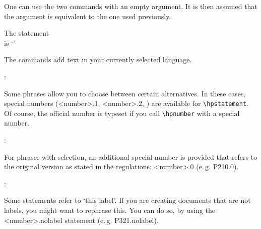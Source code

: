 \documentclass[a4paper,notitlepage,parskip=half]{scrreprt}
\begin{document}
\bigskip

\noindent One can use the two commands with an empty argument. It is then
assumed that the argument is equivalent to the one used previously. \bigskip

\begin{addmargin}[1em]{0em}
\begin{SideBySideExample}[xrightmargin=7cm]
  The statement \\
  is `\hpstatement{}'
\end{SideBySideExample}
\end{addmargin}
\bigskip

\noindent The commands add text in your currently selected language.
\bigskip

\begin{addmargin}[1em]{0em}
\begin{SideBySideExample}[xrightmargin=7cm]
  :
  \hpstatement{}
\end{SideBySideExample}
\end{addmargin}
\bigskip

\noindent Some phrases allow you to choose between certain alternatives. In
these cases, special numbers (<number>.1, <number>.2, \textellipsis) are
available for \verb|\hpstatement|. Of course, the official number is typeset if
you call \verb|\hpnumber| with a special number. \bigskip

\begin{addmargin}[1em]{0em}
\begin{SideBySideExample}[xrightmargin=7cm]
  :
  \hpstatement{}
\end{SideBySideExample}
\end{addmargin}
\bigskip

\noindent For phrases with selection, an additional special number is provided
that refers to the original version as stated in the regulations: <number>.0
(e.\,g. P210.0).
\bigskip

\begin{addmargin}[1em]{0em}
\begin{SideBySideExample}[xrightmargin=7cm]
  :
  \hpstatement{}
\end{SideBySideExample}
\end{addmargin}
\bigskip

\noindent Some statements refer to `this label'. If you are creating documents
that are not labels, you might want to rephrase this. You can do so, by using
the <number>.nolabel statement (e.\,g. P321.nolabel). \bigskip
\end{document}

